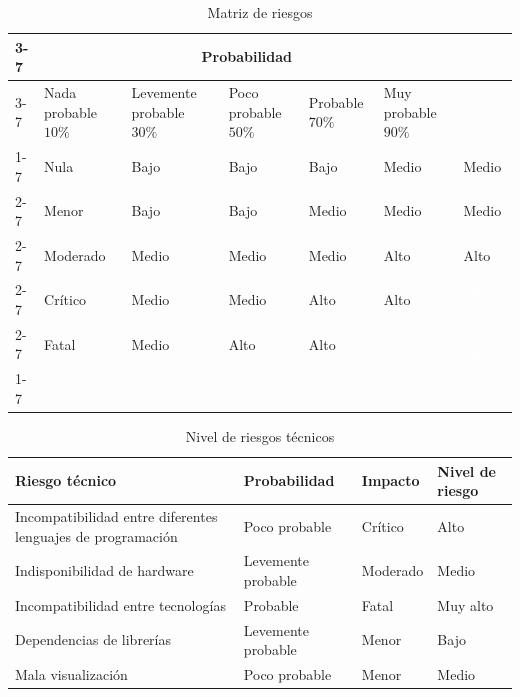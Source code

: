\begin{table}[H]
	\centering
	\renewcommand{\arraystretch}{1.2}
	\setlength{\tabcolsep}{4pt}
	\begin{tabular}{|p{}|p{}|p{}|p{}|p{}|p{}|p{}|}
		\cline{3-7}
		\multicolumn{2}{p{0.12\textwidth}}{} & \multicolumn{5}{|c|}{\textbf{Probabilidad}} \\ \cline{3-7}
		\multicolumn{2}{p{0.12\textwidth}|}{} & Nada probable $10\%$ & Levemente probable $30\%$ & Poco probable $50\%$ & Probable $70\%$ & Muy probable $90\%$ \\ \cline{1-7}
		\multirow{5}{*}{\textbf{Severidad}} 
		& Nula & \cellcolor{green!30}Bajo & \cellcolor{green!30}Bajo & \cellcolor{green!30}Bajo & \cellcolor{yellow!40}Medio & \cellcolor{yellow!40}Medio \\ \cline{2-7}
		& Menor & \cellcolor{green!30}Bajo & \cellcolor{green!30}Bajo & \cellcolor{yellow!40}Medio & \cellcolor{yellow!40}Medio & \cellcolor{yellow!40}Medio \\ \cline{2-7}
		& Moderado & \cellcolor{yellow!40}Medio & \cellcolor{yellow!40}Medio & \cellcolor{yellow!40}Medio & \cellcolor{red!40}Alto & \cellcolor{red!40}Alto \\ \cline{2-7}
		& Crítico & \cellcolor{yellow!40}Medio & \cellcolor{yellow!40}Medio & \cellcolor{red!40}Alto & \cellcolor{red!40}Alto & \cellcolor{black!80}\textcolor{white}{Muy alto} \\ \cline{2-7}
		& Fatal & \cellcolor{yellow!40}Medio & \cellcolor{red!40}Alto & \cellcolor{red!40}Alto & \cellcolor{black!80}\textcolor{white}{Muy alto} & \cellcolor{black!80}\textcolor{white}{Muy alto} \\ \cline{1-7}
	\end{tabular}
	\caption{Matriz de riesgos \cite{matriz_riesgos}}
	\label{table:matriz_riesgos}
\end{table}

\begin{table}[H]
	\centering
	\renewcommand{\arraystretch}{1.2}
	\setlength{\tabcolsep}{4pt}
	\begin{tabular}{|p{}|p{}|p{}|p{}|}
		\hline
		\textbf{Riesgo técnico} & \textbf{Probabilidad} & \textbf{Impacto} & \textbf{Nivel de riesgo} \\ \hline
		Incompatibilidad entre diferentes lenguajes de programación & Poco probable & Crítico & Alto \\ \hline
		Indisponibilidad de hardware & Levemente probable & Moderado & Medio \\ \hline
		Incompatibilidad entre tecnologías & Probable & Fatal & Muy alto \\ \hline
		Dependencias de librerías & Levemente probable & Menor & Bajo\\ \hline
		Mala visualización & Poco probable & Menor & Medio \\ \hline
	\end{tabular}
	\caption{Nivel de riesgos técnicos}
	\label{table:riesgos_tecnicos}
\end{table}

